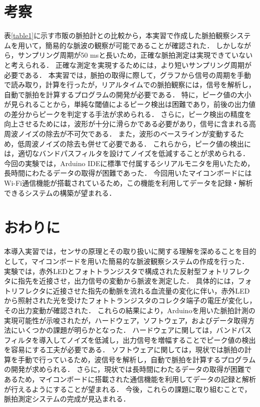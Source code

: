 \clearpage
\section{考察}

表\ref{table1}に示す市販の脈拍計との比較から，本実習で作成した脈拍観察システムを用いて，簡易的な脈波の観察が可能であることが確認された．
しかしながら，サンプリング周期が50 msと長いため，正確な脈拍測定は実現できていないと考えられる．
正確な測定を実現するためには，より短いサンプリング周期が必要である．
本実習では，脈拍の取得に際して，グラフから信号の周期を手動で読み取り，計算を行ったが，リアルタイムでの脈拍観察には，信号を解析し，自動で脈拍を計算するプログラムの開発が必要である．
特に，ピーク値の大小が見られることから，単純な閾値によるピーク検出は困難であり，前後の出力値の差分からピークを判定する手法が求められる．
さらに，ピーク検出の精度を向上させるためには，波形が十分に滑らかである必要があり，信号に含まれる高周波ノイズの除去が不可欠である．
また，波形のベースラインが変動するため，低周波ノイズの除去も併せて必要である．
これらから，ピーク値の検出には，適切なバンドパスフィルタを設けてノイズを低減することが求められる．
今回の実験では，Arduino IDEに標準で付属するシリアルモニタを用いたため，長時間にわたるデータの取得が困難であった．
今回用いたマイコンボードにはWi-Fi通信機能が搭載されているため，この機能を利用してデータを記録・解析できるシステムの構築が望まれる．



\section{おわりに}

本導入実習では，センサの原理とその取り扱いに関する理解を深めることを目的として，マイコンボードを用いた簡易的な脈波観察システムの作成を行った．
実験では，赤外LEDとフォトトランジスタで構成された反射型フォトリフレクタに指先を近接させ，出力信号の変動から脈波を測定した．
具体的には，フォトリフレクタに近接させた指先の動脈を流れる血流量の変化に伴い，赤外LEDから照射された光を受けたフォトトランジスタのコレクタ端子の電圧が変化し，その出力変動が確認された．
これらの結果により，Arduinoを用いた脈拍計測の実現可能性が示唆されたが，ハードウェア，ソフトウェア，およびデータ取得方法にいくつかの課題が明らかとなった．
ハードウェアに関しては，バンドパスフィルタを導入してノイズを低減し，出力信号を増幅することでピーク値の検出を容易にする工夫が必要である．
ソフトウェアに関しては，現状では脈拍の計算を手動で行っているため，波信号を解析し，自動で脈拍を計算するプログラムの開発が求められる．
さらに，現状では長時間にわたるデータの取得が困難であるため，マイコンボードに搭載された通信機能を利用してデータの記録と解析が行えるようにすることが望まれる．
今後，これらの課題に取り組むことで，脈拍測定システムの完成が見込まれる．

